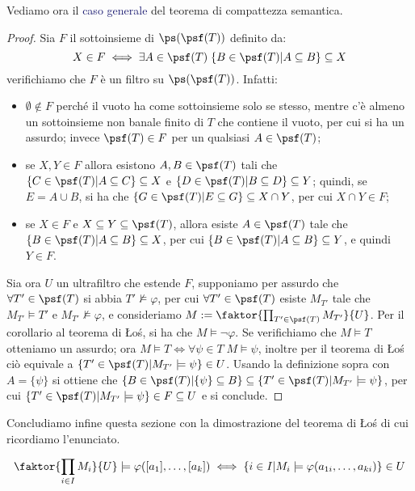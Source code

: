 Vediamo ora il \textcolor{MidnightBlue}{caso generale} del teorema di compattezza semantica.

\begin{proof}
    Sia $F$ il sottoinsieme di $\ps(\psf(T))$ definito da:
    \[ X \in F \iff \exists A \in \psf(T) \; \{B \in \psf(T) | A \subseteq B\} \subseteq X
    \]
    verifichiamo che $F$ è un filtro su $\ps(\psf(T))$. Infatti:
    \begin{itemize}
        \item $\emptyset \notin F$ perché il vuoto ha come sottoinsieme solo se stesso, mentre c'è almeno un sottoinsieme non banale finito di $T$ che contiene il vuoto, per cui si ha un assurdo; invece $\psf(T) \in F$ per un qualsiasi $A \in \psf(T)$;
        \item se $X,Y \in F$ allora esistono $A,B \in \psf(T)$ tali che $\{C \in \psf(T) | A \subseteq C\} \subseteq X$ e $\{D \in \psf(T) | B \subseteq D\} \subseteq Y$; quindi, se $E = A \cup B$, si ha che $\{G \in \psf(T) | E \subseteq G\} \subseteq X \cap Y$, per cui $X \cap Y \in F$;
        \item se $X \in F$ e $X \subseteq Y \subseteq \psf(T)$, allora esiste $A \in \psf(T)$ tale che $\{B \in \psf(T) | A \subseteq B\} \subseteq X$, per cui $\{B \in \psf(T) | A \subseteq B\} \subseteq Y$, e quindi $Y \in F$.
    \end{itemize}
    Sia ora $U$ un ultrafiltro che estende $F$, supponiamo per assurdo che $\forall T' \in \psf(T)$ si abbia $T' \not \models \varphi$, per cui $\forall T' \in \psf(T)$ esiste $M_{T'}$ tale che $M_{T'} \models T'$ e $M_{T'} \not \models \varphi$, e consideriamo $M := \faktor{\prod_{T' \in \psf(T)} M_{T'}}{U}$.
    Per il corollario al teorema di Łoś, si ha che $M \models \neg \varphi$. Se verifichiamo che $M \models T$ otteniamo un assurdo; ora $M \models T \iff \forall \psi \in T \; M \models \psi$, inoltre per il teorema di Łoś ciò equivale a $\{T' \in \psf(T) | M_{T'} \models \psi\} \in U$. Usando la definizione sopra
    con $A = \{\psi\}$ si ottiene che $\{B \in \psf(T) | \{\psi\} \subseteq B\} \subseteq \{T' \in \psf(T) | M_{T'} \models \psi\}$, per cui $\{T' \in \psf(T) | M_{T'} \models \psi\} \in F \subseteq U$ e si conclude.
\end{proof}

Concludiamo infine questa sezione con la dimostrazione del teorema di Łoś di cui ricordiamo l'enunciato.

\begin{theorem}
    \[ \faktor{\prod_{i \in I} M_i}{U} \models \varphi([a_1],\ldots,[a_k]) \iff \{i \in I | M_i \models \varphi(a_{1i},\ldots,a_{ki})\} \in U
    \]
\end{theorem}

